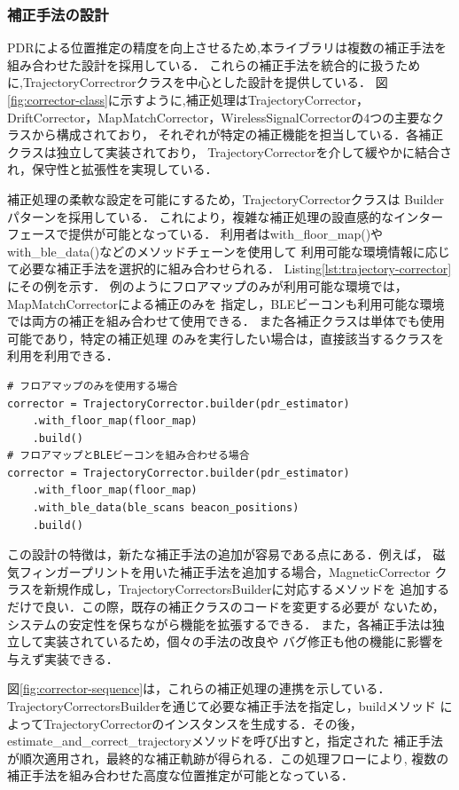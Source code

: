 
\subsubsection{補正手法の設計}

PDRによる位置推定の精度を向上させるため,本ライブラリは複数の補正手法を
組み合わせた設計を採用している．
これらの補正手法を統合的に扱うために,TrajectoryCorrectrorクラスを中心とした設計を提供している．
図\ref{fig:corrector-class}に示すように,補正処理はTrajectoryCorrector，
DriftCorrector，MapMatchCorrector，WirelessSignalCorrectorの4つの主要なクラスから構成されており，
それぞれが特定の補正機能を担当している．各補正クラスは独立して実装されており，
TrajectoryCorrectorを介して緩やかに結合され，保守性と拡張性を実現している．

補正処理の柔軟な設定を可能にするため，TrajectoryCorrectorクラスは
Builderパターンを採用している．
これにより，複雑な補正処理の設直感的なインターフェースで提供が可能となっている．
利用者はwith\_floor\_map()やwith\_ble\_data()などのメソッドチェーンを使用して
利用可能な環境情報に応じて必要な補正手法を選択的に組み合わせられる．
Listing\ref{lst:trajectory-corrector}にその例を示す．
例のようにフロアマップのみが利用可能な環境では，MapMatchCorrectorによる補正のみを
指定し，BLEビーコンも利用可能な環境では両方の補正を組み合わせて使用できる．
また各補正クラスは単体でも使用可能であり，特定の補正処理
のみを実行したい場合は，直接該当するクラスを利用を利用できる．

\begin{lstlisting}[caption={TrajectoryCorrectorの使用例},label=lst:trajectory-corrector,float=h]
# フロアマップのみを使用する場合
corrector = TrajectoryCorrector.builder(pdr_estimator)
    .with_floor_map(floor_map)
    .build()
# フロアマップとBLEビーコンを組み合わせる場合
corrector = TrajectoryCorrector.builder(pdr_estimator)
    .with_floor_map(floor_map)
    .with_ble_data(ble_scans beacon_positions)
    .build()
\end{lstlisting}

この設計の特徴は，新たな補正手法の追加が容易である点にある．例えば，
磁気フィンガープリントを用いた補正手法を追加する場合，MagneticCorrector
クラスを新規作成し，TrajectoryCorrectorsBuilderに対応するメソッドを
追加するだけで良い．この際，既存の補正クラスのコードを変更する必要が
ないため，システムの安定性を保ちながら機能を拡張するできる．
また，各補正手法は独立して実装されているため，個々の手法の改良や
バグ修正も他の機能に影響を与えず実装できる．

図\ref{fig:corrector-sequence}は，これらの補正処理の連携を示している．
TrajectoryCorrectorsBuilderを通じて必要な補正手法を指定し，buildメソッド
によってTrajectoryCorrectorのインスタンスを生成する．その後，
estimate\_and\_correct\_trajectoryメソッドを呼び出すと，指定された
補正手法が順次適用され，最終的な補正軌跡が得られる．この処理フローにより,
複数の補正手法を組み合わせた高度な位置推定が可能となっている．

